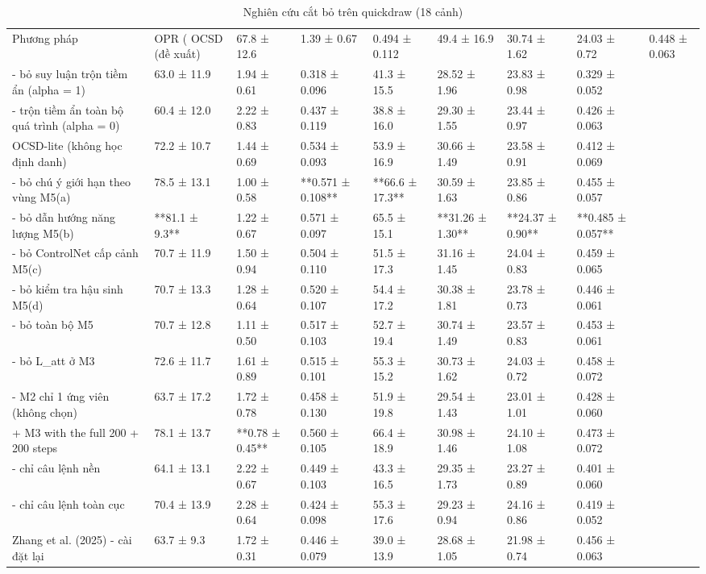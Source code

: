 \begin{table}
\caption{Nghiên cứu cắt bỏ trên quickdraw (18 cảnh)}
\begin{tabular}{llllllll}
\toprule
Phương pháp & OPR (%
\midrule
OCSD (đề xuất) & 67.8 ± 12.6 & 1.39 ± 0.67 & 0.494 ± 0.112 & 49.4 ± 16.9 & 30.74 ± 1.62 & 24.03 ± 0.72 & 0.448 ± 0.063 \\
- bỏ suy luận trộn tiềm ẩn (alpha = 1) & 63.0 ± 11.9 & 1.94 ± 0.61 & 0.318 ± 0.096 & 41.3 ± 15.5 & 28.52 ± 1.96 & 23.83 ± 0.98 & 0.329 ± 0.052 \\
- trộn tiềm ẩn toàn bộ quá trình (alpha = 0) & 60.4 ± 12.0 & 2.22 ± 0.83 & 0.437 ± 0.119 & 38.8 ± 16.0 & 29.30 ± 1.55 & 23.44 ± 0.97 & 0.426 ± 0.063 \\
OCSD-lite (không học định danh) & 72.2 ± 10.7 & 1.44 ± 0.69 & 0.534 ± 0.093 & 53.9 ± 16.9 & 30.66 ± 1.49 & 23.58 ± 0.91 & 0.412 ± 0.069 \\
- bỏ chú ý giới hạn theo vùng M5(a) & 78.5 ± 13.1 & 1.00 ± 0.58 & **0.571 ± 0.108** & **66.6 ± 17.3** & 30.59 ± 1.63 & 23.85 ± 0.86 & 0.455 ± 0.057 \\
- bỏ dẫn hướng năng lượng M5(b) & **81.1 ± 9.3** & 1.22 ± 0.67 & 0.571 ± 0.097 & 65.5 ± 15.1 & **31.26 ± 1.30** & **24.37 ± 0.90** & **0.485 ± 0.057** \\
- bỏ ControlNet cấp cảnh M5(c) & 70.7 ± 11.9 & 1.50 ± 0.94 & 0.504 ± 0.110 & 51.5 ± 17.3 & 31.16 ± 1.45 & 24.04 ± 0.83 & 0.459 ± 0.065 \\
- bỏ kiểm tra hậu sinh M5(d) & 70.7 ± 13.3 & 1.28 ± 0.64 & 0.520 ± 0.107 & 54.4 ± 17.2 & 30.38 ± 1.81 & 23.78 ± 0.73 & 0.446 ± 0.061 \\
- bỏ toàn bộ M5 & 70.7 ± 12.8 & 1.11 ± 0.50 & 0.517 ± 0.103 & 52.7 ± 19.4 & 30.74 ± 1.49 & 23.57 ± 0.83 & 0.453 ± 0.061 \\
- bỏ L_att ở M3 & 72.6 ± 11.7 & 1.61 ± 0.89 & 0.515 ± 0.101 & 55.3 ± 15.2 & 30.73 ± 1.62 & 24.03 ± 0.72 & 0.458 ± 0.072 \\
- M2 chỉ 1 ứng viên (không chọn) & 63.7 ± 17.2 & 1.72 ± 0.78 & 0.458 ± 0.130 & 51.9 ± 19.8 & 29.54 ± 1.43 & 23.01 ± 1.01 & 0.428 ± 0.060 \\
+ M3 with the full 200 + 200 steps & 78.1 ± 13.7 & **0.78 ± 0.45** & 0.560 ± 0.105 & 66.4 ± 18.9 & 30.98 ± 1.46 & 24.10 ± 1.08 & 0.473 ± 0.072 \\
- chỉ câu lệnh nền & 64.1 ± 13.1 & 2.22 ± 0.67 & 0.449 ± 0.103 & 43.3 ± 16.5 & 29.35 ± 1.73 & 23.27 ± 0.89 & 0.401 ± 0.060 \\
- chỉ câu lệnh toàn cục & 70.4 ± 13.9 & 2.28 ± 0.64 & 0.424 ± 0.098 & 55.3 ± 17.6 & 29.23 ± 0.94 & 24.16 ± 0.86 & 0.419 ± 0.052 \\
Zhang et al. (2025) - cài đặt lại & 63.7 ± 9.3 & 1.72 ± 0.31 & 0.446 ± 0.079 & 39.0 ± 13.9 & 28.68 ± 1.05 & 21.98 ± 0.74 & 0.456 ± 0.063 \\
\bottomrule
\end{tabular}
\end{table}
